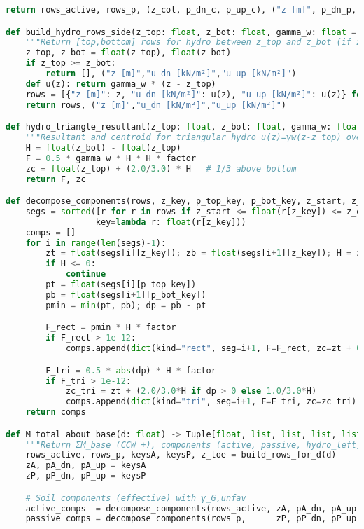 \begin{lstlisting}[language=Python]
    return rows_active, rows_p, (z_col, p_dn_c, p_up_c), ("z [m]", p_dn_p, p_up_p), z_toe

def build_hydro_rows_side(z_top: float, z_bot: float, gamma_w: float = 9.81):
    """Return [top,bottom] rows for hydro between z_top and z_bot (if z_top < z_bot)."""
    z_top, z_bot = float(z_top), float(z_bot)
    if z_top >= z_bot:
        return [], ("z [m]","u_dn [kN/m²]","u_up [kN/m²]")
    def u(z): return gamma_w * (z - z_top)
    rows = [{"z [m]": z, "u_dn [kN/m²]": u(z), "u_up [kN/m²]": u(z)} for z in [z_top, z_bot]]
    return rows, ("z [m]","u_dn [kN/m²]","u_up [kN/m²]")

def hydro_triangle_resultant(z_top: float, z_bot: float, gamma_w: float = 9.81, factor: float = 1.0):
    """Resultant and centroid for triangular hydro u(z)=γw(z-z_top) over [z_top,z_bot], with factor."""
    H = float(z_bot) - float(z_top)
    F = 0.5 * gamma_w * H * H * factor
    zc = float(z_top) + (2.0/3.0) * H   # 1/3 above bottom
    return F, zc

def decompose_components(rows, z_key, p_top_key, p_bot_key, z_start, z_end, factor: float = 1.0):
    segs = sorted([r for r in rows if z_start <= float(r[z_key]) <= z_end],
                  key=lambda r: float(r[z_key]))
    comps = []
    for i in range(len(segs)-1):
        zt = float(segs[i][z_key]); zb = float(segs[i+1][z_key]); H = zb - zt
        if H <= 0:
            continue
        pt = float(segs[i][p_top_key])
        pb = float(segs[i+1][p_bot_key])
        pmin = min(pt, pb); dp = pb - pt

        F_rect = pmin * H * factor
        if F_rect > 1e-12:
            comps.append(dict(kind="rect", seg=i+1, F=F_rect, zc=zt + 0.5*H))

        F_tri = 0.5 * abs(dp) * H * factor
        if F_tri > 1e-12:
            zc_tri = zt + (2.0/3.0*H if dp > 0 else 1.0/3.0*H)
            comps.append(dict(kind="tri", seg=i+1, F=F_tri, zc=zc_tri))
    return comps

def M_total_about_base(d: float) -> Tuple[float, list, list, list, list, float]:
    """Return ΣM_base (CCW +), components (active, passive, hydro_left, hydro_right), and z_toe."""
    rows_active, rows_p, keysA, keysP, z_toe = build_rows_for_d(d)
    zA, pA_dn, pA_up = keysA
    zP, pP_dn, pP_up = keysP

    # Soil components (effective) with γ_G,unfav
    active_comps  = decompose_components(rows_active, zA, pA_dn, pA_up, 0.0, z_toe, factor=gamma_G_unfav)  # right → CCW(+)
    passive_comps = decompose_components(rows_p,      zP, pP_dn, pP_up, Z,  z_toe, factor=gamma_G_unfav)  # left  → CW(-)


\end{lstlisting}
